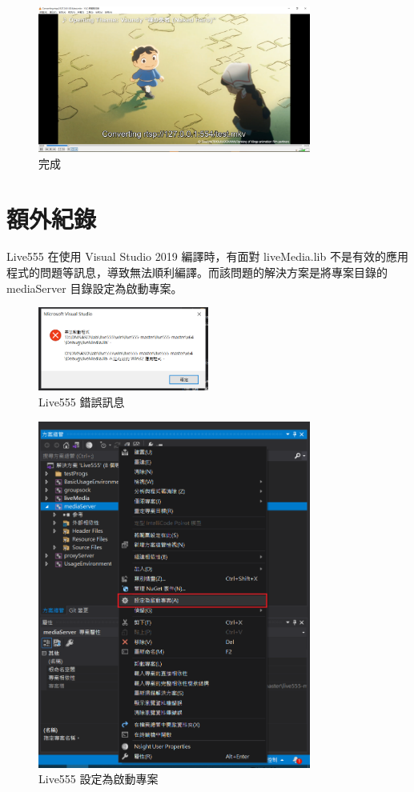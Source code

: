 \documentclass[10pt,UTF8]{ctexart}
\begin{document}
\begin{figure}[H]
\centering 
\includegraphics[width=0.80\textwidth]{17.png} 
\caption{完成}
\label{Test}
\end{figure}

\section{額外紀錄}

Live555 在使用 Visual Studio 2019 編譯時，有面對 liveMedia.lib 不是有效的應用程式的問題等訊息，導致無法順利編譯。而該問題的解決方案是將專案目錄的 mediaServer 目錄設定為啟動專案。

\begin{figure}[H]
\centering 
\includegraphics[width=0.50\textwidth]{2.png} 
\caption{Live555 錯誤訊息}
\label{Test}
\end{figure}

\begin{figure}[H]
\centering 
\includegraphics[width=0.80\textwidth]{3.png} 
\caption{Live555 設定為啟動專案}
\label{Test}
\end{figure}
\end{document}
